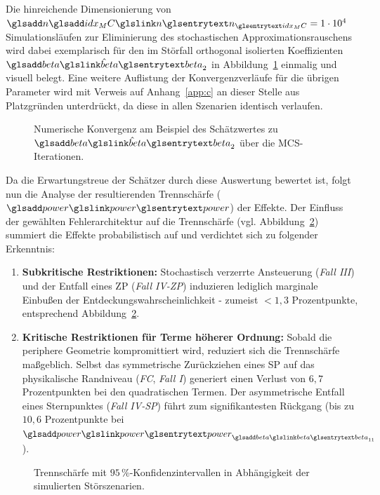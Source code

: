 Die hinreichende Dimensionierung von $\symsub{n}{idx_MC} = 1\cdot 10^4$ Simulationsläufen zur Eliminierung des stochastischen Approximationsrauschens wird dabei exemplarisch für den im Störfall orthogonal isolierten Koeffizienten $\hat{\sym{beta}}_2$ in Abbildung~\ref{fig:ma_abb5.1.4_betakonv} einmalig und visuell belegt.
Eine weitere Auflistung der Konvergenzverläufe für die übrigen Parameter wird mit Verweis auf Anhang~\ref{app:c} an dieser Stelle aus Platzgründen unterdrückt, da diese in allen Szenarien identisch verlaufen.

\begin{figure}[htbp]
    \centering
    \setlength{}
    \setlength\figureheight{6cm}
    
    \caption{Numerische Konvergenz am Beispiel des Schätzwertes zu $\hat{\sym{beta}}_2$ über die \ac{MCS}-Iterationen.}
    \label{fig:ma_abb5.1.4_betakonv}
\end{figure}

Da die Erwartungstreue der Schätzer durch diese Auswertung bewertet ist, folgt nun die Analyse der resultierenden Trennschärfe ($\sym{power}$) der Effekte.
Der Einfluss der gewählten Fehlerarchitektur auf die Trennschärfe (vgl. Abbildung~\ref{fig:ma_abb5.1.4_powerdev}) summiert die Effekte probabilistisch auf und verdichtet sich zu folgender Erkenntnis:
\begin{enumerate}
    \item \textbf{Subkritische Restriktionen:} Stochastisch verzerrte Ansteuerung (\textit{Fall III}) und der Entfall eines \ac{ZP} (\textit{Fall IV-\ac{ZP}}) induzieren lediglich marginale Einbußen der Entdeckungswahrscheinlichkeit - zumeist $< 1{,}3$ Prozentpunkte, entsprechend Abbildung~\ref{fig:ma_abb5.1.4_powerdev}.
    \item \textbf{Kritische Restriktionen für Terme höherer Ordnung:} Sobald die periphere Geometrie kompromittiert wird, reduziert sich die Trennschärfe maßgeblich. Selbst das symmetrische Zurückziehen eines \ac{SP} auf das physikalische Randniveau (\textit{\ac{FC}}, \textit{Fall I}) generiert einen Verlust von $6{,}7$ Prozentpunkten bei den quadratischen Termen. Der asymmetrische Entfall eines Sternpunktes (\textit{Fall IV-\ac{SP}}) führt zum signifikantesten Rückgang (bis zu $10{,}6$ Prozentpunkte bei $\sym{power}_{\sym{beta}_{11}}$).
\end{enumerate}

\begin{figure}[htbp]
    \centering
    \setlength{}
    \setlength\figureheight{6cm}
    
    \caption{Trennschärfe mit $95\,\%$-Konfidenzintervallen in Abhängigkeit der simulierten Störszenarien.}
    \label{fig:ma_abb5.1.4_powerdev}
\end{figure}

